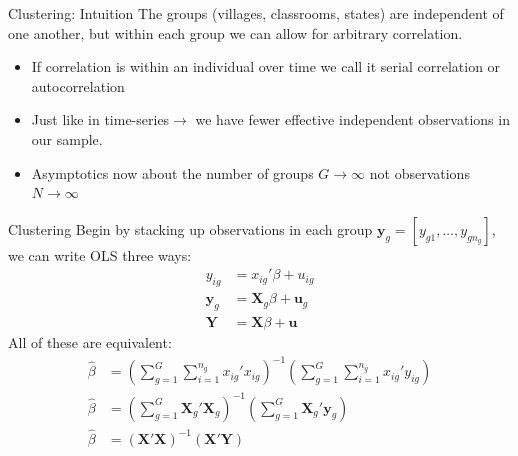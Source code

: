 \documentclass[aspectratio=169,11pt]{beamer}
\begin{document}
\begin{frame}{Clustering: Intuition}
The groups (villages, classrooms, states) are independent of one another, but within each group we can allow for arbitrary correlation.
\begin{itemize}
\item If correlation is within an individual over time we call it \alert{serial correlation} or \alert{autocorrelation}
\item Just like in time-series$\rightarrow$ we have fewer effective independent observations in our sample.
\item Asymptotics now about the number of groups $G \rightarrow \infty$ not observations $N \rightarrow \infty$
\end{itemize}
\end{frame}

\begin{frame}{Clustering}
Begin by stacking up observations in each group $\mathbf{y}_{g }  = [y_{g1},\ldots,y_{g n_g}]$, we can write OLS three ways:
\begin{align*}
y_{ig } &= x_{ig}' \beta + u_{ig}\\
\mathbf{y}_{g } &= \mathbf{X}_{g} \beta + \mathbf{u}_{g}\\
\mathbf{Y} &= \mathbf{X} \beta + \mathbf{u}
\end{align*}
All of these are equivalent:
\begin{align*}
\widehat {  \beta  } &= \left( \sum _ { g = 1 } ^ { G } \sum _ { i = 1 } ^ { n _ { g } } x _ { i g }' { x } _ { i g } \right) ^ { - 1 } \left( \sum _ { g = 1 } ^ { G } \sum _ { i = 1 } ^ { n _ { g } } x _ { i g }' y _ { i g } \right)\\
\widehat {  \beta  }  &=  \left(  \sum _ { g = 1 } ^ { G } \mathbf{X}_g' \mathbf{X}_g \right)^{-1} \left(  \sum _ { g = 1 } ^ { G } \mathbf{X}_g' \mathbf{y}_g \right)\\
\widehat {  \beta  }  &=  \left( \mathbf{X}' \mathbf{X} \right)^{-1} \left(   \mathbf{X}' \mathbf{Y} \right)\\
\end{align*}
\end{frame}
\end{document}
